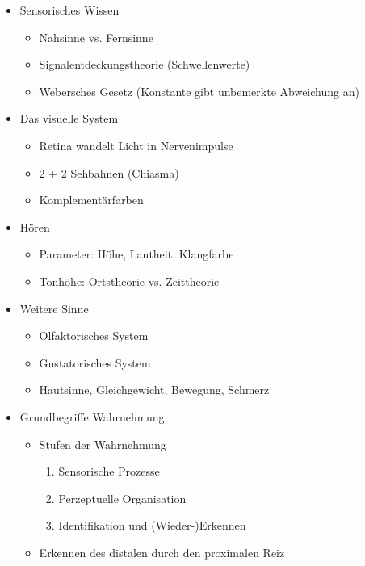 \documentclass[11pt, paper=a4, twocolumn]{scrartcl}
\begin{document}
	\begin{itemize}
		\item Sensorisches Wissen
			\begin{itemize}
				\item Nahsinne vs. Fernsinne
				\item Signalentdeckungstheorie (Schwellenwerte)
				\item Webersches Gesetz (Konstante gibt unbemerkte 
					Abweichung an)
			\end{itemize}

		\item Das visuelle System
			\begin{itemize}
				\item Retina wandelt Licht in Nervenimpulse
				\item 2 + 2 Sehbahnen (Chiasma)
				\item Komplementärfarben
			\end{itemize}

		\item Hören
			\begin{itemize}
				\item Parameter: Höhe, Lautheit, Klangfarbe
				\item Tonhöhe: Ortstheorie vs. Zeittheorie
			\end{itemize}

		\item Weitere Sinne
			\begin{itemize}
				\item Olfaktorisches System
				\item Gustatorisches System
				\item Hautsinne, Gleichgewicht, Bewegung, Schmerz
			\end{itemize}

		\item Grundbegriffe Wahrnehmung
			\begin{itemize}
				\item Stufen der Wahrnehmung
					\begin{enumerate}
						\item Sensorische Prozesse
						\item Perzeptuelle Organisation
						\item Identifikation und (Wieder-)Erkennen
					\end{enumerate}
				\item Erkennen des distalen durch den proximalen Reiz
			\end{itemize}


\end{itemize}
\end{document}

